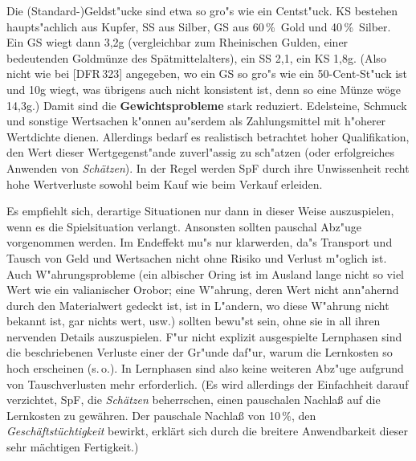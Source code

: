 \documentclass[10pt,a4paper,germanpar]{article}
\begin{document}
Die (Standard-)Geldst"ucke sind etwa so gro"s wie ein Centst"uck. KS
bestehen haupts"achlich aus Kupfer, SS aus Silber, GS aus 60\,\%\ Gold
und 40\,\%\ Silber. Ein GS wiegt dann 3,2g (vergleichbar zum
Rheinischen Gulden, einer bedeutenden Goldmünze des Spätmittelalters),
ein SS 2,1, ein KS 1,8g. (Also nicht wie bei [DFR\,323] angegeben, wo
ein GS so gro"s wie ein 50-Cent-St"uck ist und 10g wiegt, was übrigens
auch nicht konsistent ist, denn so eine Münze wöge 14,3g.) Damit sind
die \textbf{Gewichtsprobleme} stark reduziert. Edelsteine, Schmuck und
sonstige Wertsachen k"onnen au"serdem als Zahlungsmittel mit h"oherer
Wertdichte dienen. Allerdings bedarf es realistisch betrachtet hoher
Qualifikation, den Wert dieser Wertgegenst"ande zuverl"assig zu
sch"atzen (oder erfolgreiches Anwenden von \emph{Schätzen}). In der
Regel werden SpF durch ihre Unwissenheit recht hohe Wertverluste
sowohl beim Kauf wie beim Verkauf erleiden.


Es empfiehlt sich, derartige Situationen nur dann in dieser Weise
auszuspielen, wenn es die Spielsituation verlangt. Ansonsten sollten
pauschal Abz"uge vorgenommen werden. Im Endeffekt mu"s nur klarwerden,
da"s Transport und Tausch von Geld und Wertsachen nicht ohne Risiko
und Verlust m"oglich ist. Auch W"ahrungsprobleme (ein albischer Oring
ist im Ausland lange nicht so viel Wert wie ein valianischer Orobor;
eine W"ahrung, deren Wert nicht ann"ahernd durch den Materialwert
gedeckt ist, ist in L"andern, wo diese W"ahrung nicht bekannt ist, gar
nichts wert, usw.) sollten bewu"st sein, ohne sie in all ihren
nervenden Details auszuspielen. F"ur nicht explizit ausgespielte
Lernphasen sind die beschriebenen Verluste einer der Gr"unde daf"ur,
warum die Lernkosten so hoch erscheinen (s.\,o.). In Lernphasen sind
also keine weiteren Abz"uge aufgrund von Tauschverlusten mehr
erforderlich. (Es wird allerdings der Einfachheit darauf verzichtet,
SpF, die \emph{Schätzen} beherrschen, einen pauschalen Nachlaß auf die
Lernkosten zu gewähren. Der pauschale Nachlaß von 10\,\%, den
\emph{Geschäftstüchtigkeit} bewirkt, erklärt sich durch die breitere
Anwendbarkeit dieser sehr mächtigen Fertigkeit.)
\end{document}
